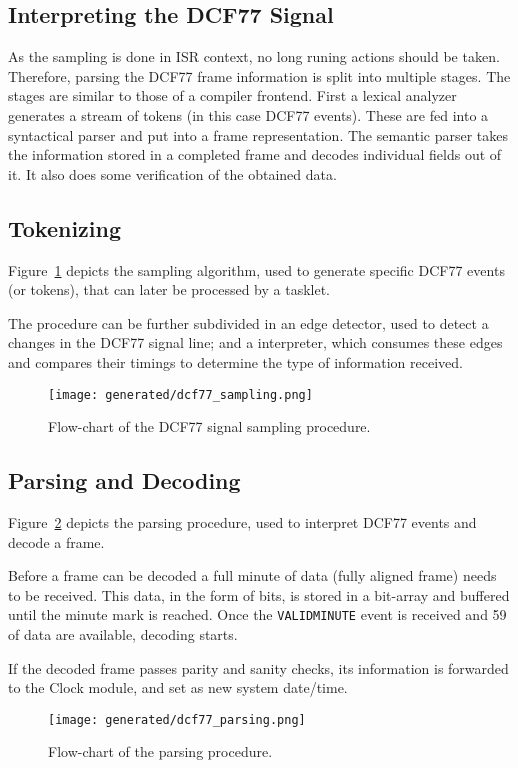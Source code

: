 \subsection{Interpreting the DCF77 Signal}

As the sampling is done in ISR context, no long runing actions should be taken. Therefore, parsing the DCF77 frame information is split into multiple stages. The stages are similar to those of a compiler frontend. First a lexical analyzer generates a stream of tokens (in this case DCF77 events). These are fed into a syntactical parser and put into a frame representation. The semantic parser takes the information stored in a completed frame and decodes individual fields out of it. It also does some verification of the obtained data.

\subsection{Tokenizing}

Figure~\ref{fig:dcf77_sampling} depicts the sampling algorithm, used to generate specific DCF77 events (or tokens), that can later be processed by a tasklet.

The procedure can be further subdivided in an edge detector, used to detect a changes in the DCF77 signal line; and a interpreter, which consumes these edges and compares their timings to determine the type of information received.

\begin{figure}[p]
    \centering
    \texttt{[image: generated/dcf77\_sampling.png]}
    \caption{Flow-chart of the DCF77 signal sampling procedure.}\label{fig:dcf77_sampling}
\end{figure}

\subsection{Parsing and Decoding}

Figure~\ref{fig:dcf77_parsing} depicts the parsing procedure, used to interpret DCF77 events and decode a frame.

Before a frame can be decoded a full minute of data (fully aligned frame) needs to be received. This data, in the form of bits, is stored in a bit-array and buffered until the minute mark is reached. Once the \texttt{VALIDMINUTE} event is received and \SI{59}{\bit} of data are available, decoding starts.

If the decoded frame passes parity and sanity checks, its information is forwarded to the Clock module, and set as new system date/time.

\begin{figure}[p]
    \centering
    \texttt{[image: generated/dcf77\_parsing.png]}
    \caption{Flow-chart of the parsing procedure.}\label{fig:dcf77_parsing}
\end{figure}
